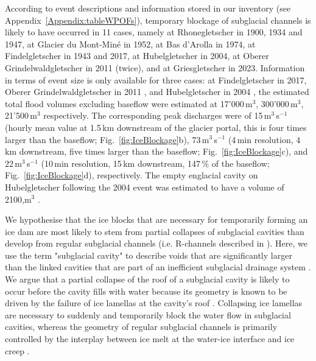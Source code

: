 According to event descriptions and information stored in our inventory (see Appendix~\ref{Appendix:tableWPOFs}), temporary blockage of subglacial channels is likely to have occurred in 11 cases, namely at Rhonegletscher in 1900, 1934 and 1947, at Glacier du Mont-Miné in 1952, at Bas d'Arolla in 1974, at Findelgletscher in 1943 and 2017, at Hubelgletscher in 2004, at Oberer Grindelwaldgletscher in 2011 (twice), and at Griesgletscher in 2023. Information in terms of event size is only available for three cases: at Findelgletscher in 2017, Oberer Grindelwaldgletscher in 2011 \citep{Hahlen2011}, and Hubelgletscher in 2004 \citep{fink2004}, the estimated total flood volumes excluding baseflow were estimated at 17'000\,m$^3$, 300'000\,m$^3$, 21'500\,m$^3$ respectively. The corresponding peak discharges were of  15\,m$^3$\,s$^{-1}$ (hourly mean value at 1.5\,km downstream of the glacier portal, this is four times larger than the baseflow; Fig.~\ref{fig:IceBlockage}b),  73\,m$^3$\,s$^{-1}$ (4\,min resolution, 4\,km downstream, five times larger than the baseflow; Fig.~\ref{fig:IceBlockage}c), and 22\,m$^3$\,s$^{-1}$ (10\,min resolution, 15\,km downstream, 147\,\% of the baseflow; Fig.~\ref{fig:IceBlockage}d), respectively. The empty englacial cavity on Hubelgletscher following the 2004 event was estimated to have a volume of 2100,m$^3$ \citep{fink2004}. 

We hypothesise that the ice blocks that are necessary for temporarily forming an ice dam are most likely to stem from partial collapses of subglacial cavities than develop from regular subglacial channels (i.e. R-channels described in \cite{Roethlisberger1972}). Here, we use the term "subglacial cavity" to describe voids that are significantly larger than the linked cavities that are part of an inefficient subglacial drainage system \citep[e.g. Fig. 14 in][]{Fountain&Walder1998}. We argue that a partial collapse of the roof of a subglacial cavity is likely to occur before the cavity fills with water because its geometry is known to be driven by the failure of ice lamellas at the cavity's roof \citep{Ogier&al2022, Rass&al2023}. Collapsing ice lamellas are necessary to suddenly and temporarily block the water flow in subglacial cavities, whereas the geometry of regular subglacial channels is primarily controlled by the interplay between ice melt at the water-ice interface and ice creep \citep{Roethlisberger1972}.

